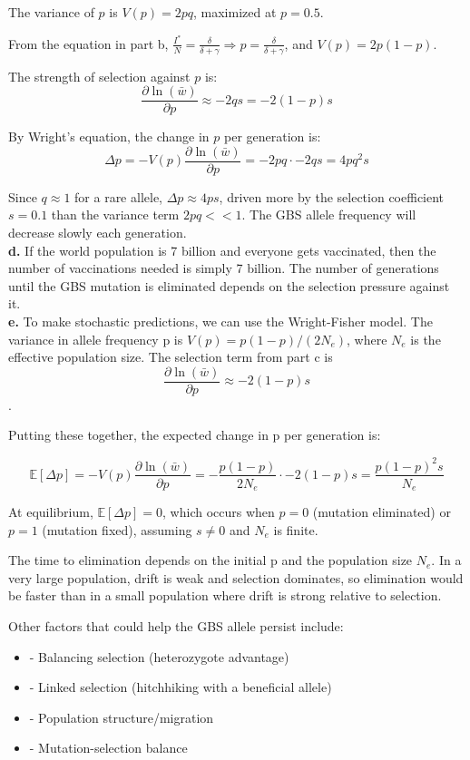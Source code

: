 \documentclass{article}
\begin{document}
The variance of \(p\) is \(V(p) = 2pq\), maximized at \(p=0.5\).

From the equation in part b, \(\frac{I^*}{N} = \frac{\delta}{\delta+\gamma}  \Rightarrow  p = \frac{\delta}{\delta+\gamma}\), and \(V(p) = 2p(1-p)\).

The strength of selection against \(p\) is:
\[\frac{\partial \ln(\bar{w})}{\partial p} \approx -2qs = -2(1-p)s\]  

By Wright's equation, the change in \(p\) per generation is:
\[\Delta p = -V(p) \frac{\partial \ln(\bar{w})}{\partial p} = -2pq \cdot -2qs = 4pq^2s\]

Since \(q \approx 1\) for a rare allele, \(\Delta p \approx 4ps\), driven more by the selection coefficient \(s=0.1\) than the variance term \(2pq<<1\). The GBS allele frequency will decrease slowly each generation.\\

\textbf{d.} If the world population is 7 billion and everyone gets vaccinated, then the number of vaccinations needed is simply 7 billion. The number of generations until the GBS mutation is eliminated depends on the selection pressure against it.\\

\textbf{e.} To make stochastic predictions, we can use the Wright-Fisher model. The variance in allele frequency p is $V(p) = p(1-p)/(2N_e)$, where $N_e$ is the effective population size. The selection term from part c is $$\frac{\partial \ln(\bar{w})}{\partial p} \approx -2(1-p)s$$.

Putting these together, the expected change in p per generation is:

$$\mathbb{E}[\Delta p] = -V(p) \frac{\partial \ln(\bar{w})}{\partial p} = -\frac{p(1-p)}{2N_e} \cdot -2(1-p)s = \frac{p(1-p)^2 s}{N_e}$$

At equilibrium, $\mathbb{E}[\Delta p] = 0$, which occurs when $p=0$ (mutation eliminated) or $p=1$ (mutation fixed), assuming $s \neq 0$ and $N_e$ is finite.

The time to elimination depends on the initial p and the population size $N_e$. In a very large population, drift is weak and selection dominates, so elimination would be faster than in a small population where drift is strong relative to selection.

Other factors that could help the GBS allele persist include:
\begin{itemize}
    \item - Balancing selection (heterozygote advantage)
    \item - Linked selection (hitchhiking with a beneficial allele)
    \item - Population structure/migration
    \item - Mutation-selection balance
\end{itemize}
\end{document}
